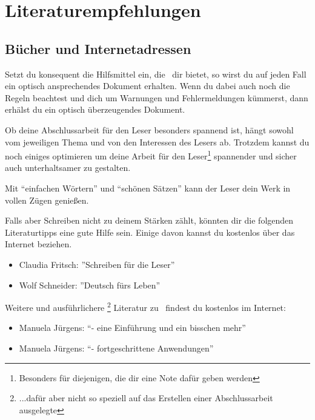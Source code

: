 
%

\chapter{Literaturempfehlungen}

\section{Bücher und Internetadressen}

Setzt du konsequent die Hilfsmittel ein, die \DMLLaTeX \ dir bietet, so wirst du auf jeden Fall ein optisch ansprechendes Dokument erhalten. Wenn du dabei auch noch die Regeln beachtest und dich um Warnungen und Fehlermeldungen kümmerst, dann erhälst du ein optisch überzeugendes Dokument.

Ob deine Abschlussarbeit für den Leser besonders spannend ist, hängt sowohl vom jeweiligen Thema und von den Interessen des Lesers ab. Trotzdem kannst du noch einiges optimieren um deine Arbeit für den Leser\footnote{Besonders für diejenigen, die dir eine Note dafür geben werden} spannender und sicher auch unterhaltsamer zu gestalten.

Mit \enquote{einfachen Wörtern} und \enquote{schönen Sätzen} kann der Leser dein Werk in vollen Zügen genießen.

Falls aber Schreiben nicht zu deinem Stärken zählt, könnten dir die folgenden Literaturtipps eine gute Hilfe sein. Einige davon kannst du kostenlos über das Internet beziehen.

\begin{itemize}
	\item{Claudia Fritsch: ''Schreiben für die Leser''\cite{fritsch:schreiben_fuer_die_Leser}}
	\item{Wolf Schneider: ''Deutsch fürs Leben''\cite{schneider:deutsch_fuers_leben}}
\end{itemize}

Weitere und ausführlichere \footnote{...dafür aber nicht so speziell auf das Erstellen einer Abschlussarbeit ausgelegte} Literatur zu \DMLLaTeX \ findest du  kostenlos im Internet:

\begin{itemize}
	\item{Manuela Jürgens: \enquote{\DMLLaTeX - eine Einführung und ein bisschen mehr}\cite{juergens:latex1}}
	\item{Manuela Jürgens: \enquote{\DMLLaTeX - fortgeschrittene Anwendungen}\cite{juergens:latex2}}
\end{itemize}

